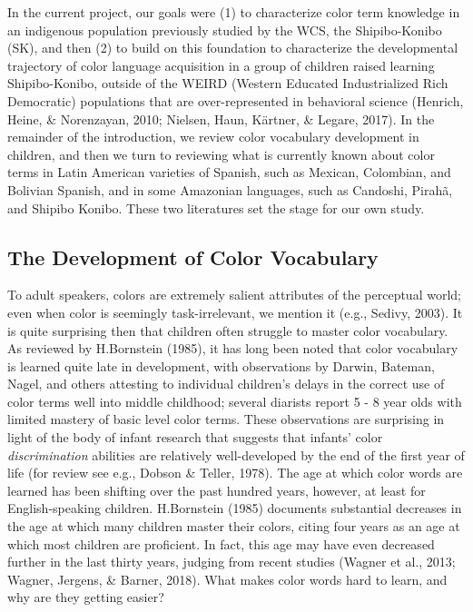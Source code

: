 \documentclass[
  english,
  ,man,floatsintext]{apa6}
\begin{document}
In the current project, our goals were (1) to characterize color term knowledge in an indigenous population previously studied by the WCS, the Shipibo-Konibo (SK), and then (2) to build on this foundation to characterize the developmental trajectory of color language acquisition in a group of children raised learning Shipibo-Konibo, outside of the WEIRD (Western Educated Industrialized Rich Democratic) populations that are over-represented in behavioral science (Henrich, Heine, \& Norenzayan, 2010; Nielsen, Haun, Kärtner, \& Legare, 2017). In the remainder of the introduction, we review color vocabulary development in children, and then we turn to reviewing what is currently known about color terms in Latin American varieties of Spanish, such as Mexican, Colombian, and Bolivian Spanish, and in some Amazonian languages, such as Candoshi, Pirahã, and Shipibo Konibo. These two literatures set the stage for our own study.

\hypertarget{the-development-of-color-vocabulary}{%
\subsection{The Development of Color Vocabulary}\label{the-development-of-color-vocabulary}}

To adult speakers, colors are extremely salient attributes of the perceptual world; even when color is seemingly task-irrelevant, we mention it (e.g., Sedivy, 2003). It is quite surprising then that children often struggle to master color vocabulary. As reviewed by H.Bornstein (1985), it has long been noted that color vocabulary is learned quite late in development, with observations by Darwin, Bateman, Nagel, and others attesting to individual children's delays in the correct use of color terms well into middle childhood; several diarists report 5 - 8 year olds with limited mastery of basic level color terms. These observations are surprising in light of the body of infant research that suggests that infants' color \emph{discrimination} abilities are relatively well-developed by the end of the first year of life (for review see e.g., Dobson \& Teller, 1978). The age at which color words are learned has been shifting over the past hundred years, however, at least for English-speaking children. H.Bornstein (1985) documents substantial decreases in the age at which many children master their colors, citing four years as an age at which most children are proficient. In fact, this age may have even decreased further in the last thirty years, judging from recent studies (Wagner et al., 2013; Wagner, Jergens, \& Barner, 2018). What makes color words hard to learn, and why are they getting easier?
\end{document}

